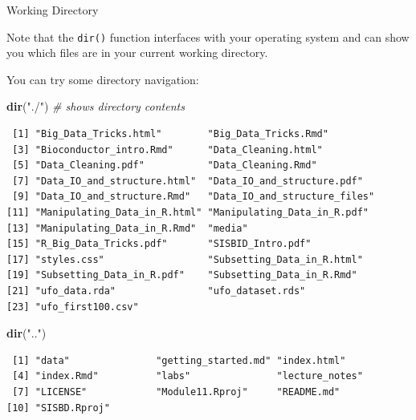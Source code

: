 \documentclass[
  ignorenonframetext,
]{beamer}
\newenvironment{Shaded}{\begin{snugshade}}{\end{snugshade}}
\newcommand{\CommentTok}[1]{\textcolor[rgb]{0.56,0.35,0.01}{\textit{#1}}}
\newcommand{\KeywordTok}[1]{\textcolor[rgb]{0.13,0.29,0.53}{\textbf{#1}}}
\newcommand{\NormalTok}[1]{#1}
\newcommand{\StringTok}[1]{\textcolor[rgb]{0.31,0.60,0.02}{#1}}
\begin{document}
\begin{frame}[fragile]{Working Directory}
\protect\hypertarget{working-directory}{}

Note that the \texttt{dir()} function interfaces with your operating
system and can show you which files are in your current working
directory.

You can try some directory navigation:

\begin{Shaded}
\begin{Highlighting}[]
\KeywordTok{dir}\NormalTok{(}\StringTok{"./"}\NormalTok{) }\CommentTok{# shows directory contents}
\end{Highlighting}
\end{Shaded}

\begin{verbatim}
 [1] "Big_Data_Tricks.html"        "Big_Data_Tricks.Rmd"        
 [3] "Bioconductor_intro.Rmd"      "Data_Cleaning.html"         
 [5] "Data_Cleaning.pdf"           "Data_Cleaning.Rmd"          
 [7] "Data_IO_and_structure.html"  "Data_IO_and_structure.pdf"  
 [9] "Data_IO_and_structure.Rmd"   "Data_IO_and_structure_files"
[11] "Manipulating_Data_in_R.html" "Manipulating_Data_in_R.pdf" 
[13] "Manipulating_Data_in_R.Rmd"  "media"                      
[15] "R_Big_Data_Tricks.pdf"       "SISBID_Intro.pdf"           
[17] "styles.css"                  "Subsetting_Data_in_R.html"  
[19] "Subsetting_Data_in_R.pdf"    "Subsetting_Data_in_R.Rmd"   
[21] "ufo_data.rda"                "ufo_dataset.rds"            
[23] "ufo_first100.csv"           
\end{verbatim}

\begin{Shaded}
\begin{Highlighting}[]
\KeywordTok{dir}\NormalTok{(}\StringTok{".."}\NormalTok{)}
\end{Highlighting}
\end{Shaded}

\begin{verbatim}
 [1] "data"               "getting_started.md" "index.html"        
 [4] "index.Rmd"          "labs"               "lecture_notes"     
 [7] "LICENSE"            "Module11.Rproj"     "README.md"         
[10] "SISBD.Rproj"       
\end{verbatim}

\end{frame}
\end{document}
